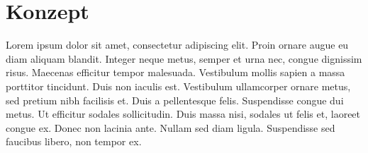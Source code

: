 \chapter{Konzept}

Lorem ipsum dolor sit amet, consectetur adipiscing elit.
Proin ornare augue eu diam aliquam blandit.
Integer neque metus, semper et urna nec, congue dignissim risus.
Maecenas efficitur tempor malesuada.
Vestibulum mollis sapien a massa porttitor tincidunt.
Duis non iaculis est.
Vestibulum ullamcorper ornare metus, sed pretium nibh facilisis et.
Duis a pellentesque felis.
Suspendisse congue dui metus.
Ut efficitur sodales sollicitudin.
Duis massa nisi, sodales ut felis et, laoreet congue ex.
Donec non lacinia ante.
Nullam sed diam ligula.
Suspendisse sed faucibus libero, non tempor ex. 
